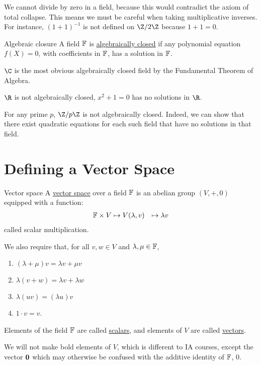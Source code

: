 \documentclass[../Main.tex]{subfiles}
\begin{document}
We cannot divide by zero in a field, because this would contradict the axiom of total collapse. This means we must be careful when taking multiplicative inverses. For instance, $(1 + 1)^{-1}$ is not defined on $\Z / 2\Z$ because $1 + 1 = 0$.
\begin{definition}{Algebraic closure}
    A field $\mathbb{F}$ is \underline{algebraically closed} if any polynomial equation $f(X) = 0$, with coefficients in $\mathbb{F}$, has a solution in $\mathbb{F}$.
\end{definition}
\begin{example}
    $\C$ is the most obvious algebraically closed field by the Fundamental Theorem of Algebra.
\end{example}
\begin{examples}
    \item $\R$ is not algebraically closed, $x^2 + 1 = 0$ has no solutions in $\R$.
    \item For any prime $p$, $\Z / p\Z$ is not algebraically closed. Indeed, we can show that there exist quadratic equations for each such field that have no solutions in that field.
\end{examples}
\section{Defining a Vector Space}
\begin{definition}{Vector space}
    A \underline{vector space} over a field $\mathbb{F}$ is an abelian group $(V, +, 0)$ equipped with a function:
    \begin{align*}
        \mathbb{F} \times V &\mapsto V
        (\lambda, v) &\mapsto \lambda v
    \end{align*}
    called scalar multiplication.

    We also require that, for all $v, w \in V$ and $\lambda, \mu \in \mathbb{F}$,
    \begin{enumerate}
        \item $(\lambda + \mu)v = \lambda v + \mu v$
        \item $\lambda (v + w) = \lambda v + \lambda w$
        \item $\lambda (u v) = (\lambda u)v$
        \item $1 \cdot v = v$.
    \end{enumerate}
    Elements of the field $\mathbb{F}$ are called \underline{scalars}, and elements of $V$ are called \underline{vectors}.
\end{definition}
We will not make bold elements of $V$, which is different to IA courses, except the vector $\boldsymbol{0}$ which may otherwise be confused with the additive identity of $\mathbb{F}$, $0$.
\end{document}
